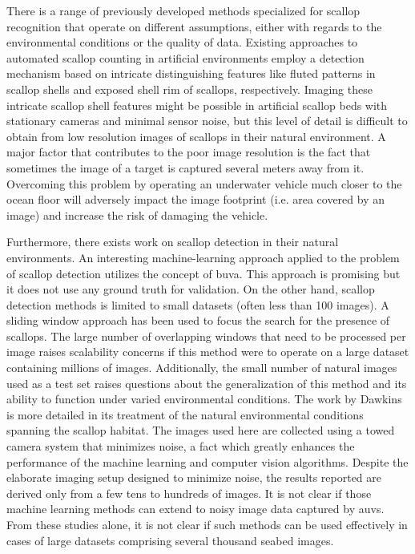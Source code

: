 \documentclass {udthesis}
\begin{document}
There is a range of previously developed methods specialized for scallop recognition 
\cite{dawkings13,guomundsson,enomoto9,enomoto10,fearn, prasanna_med, prasanna_aslo, prasanna_igi} 
that operate on different assumptions, either with regards to the environmental conditions or the quality of data.
Existing approaches to automated scallop counting in artificial environments
 \cite{enomoto9, enomoto10} employ a detection mechanism based on intricate distinguishing features 
like fluted patterns in scallop shells and exposed shell rim of scallops, respectively.
Imaging these intricate scallop shell features might
be possible in artificial scallop beds with stationary cameras and 
minimal sensor noise, but this level of detail 
is difficult to obtain from low resolution images of scallops in their natural environment. 
A major factor that contributes to the poor image resolution is the fact that sometimes the image of a target
is captured several meters away from it. 
Overcoming this problem by operating an underwater vehicle much closer to the ocean floor 
will adversely impact the image footprint (i.e. area covered by an image) and increase the risk of damaging the vehicle.

Furthermore, there exists work on scallop detection \cite{dawkings13, guomundsson, fearn} in their natural
environments.
An interesting machine-learning approach applied to the problem of scallop detection \cite{fearn} 
utilizes the concept of \gls{buva}. This approach is promising but it does not use any ground truth for validation.  
On the other hand, scallop detection methods \cite{dawkings13, guomundsson} is limited to small datasets (often less than 100 images). 
A sliding window approach has been used \cite{guomundsson} to focus the search for the presence of scallops. The large number of overlapping windows that need to be processed per image raises scalability concerns if this method were to operate 
on a large dataset containing millions of images. Additionally, the small number of natural images used as a test set raises questions about the generalization of this method and its ability to function under varied environmental conditions.
The work by Dawkins \cite{dawkings13} is more detailed in its treatment of the natural environmental conditions spanning the scallop habitat. The images used here are collected using a towed camera system that minimizes noise, a fact which greatly enhances the performance of the machine learning and computer vision algorithms. Despite the elaborate imaging setup designed to minimize noise, the results reported are derived only from a few tens to hundreds of images.
It is not clear if those machine learning methods \cite{dawkings13} can extend to noisy image data captured by \gls{auv}s.
From these studies alone, it is not clear if such methods can be used effectively
in cases of large datasets comprising several thousand seabed images.
\end{document}

